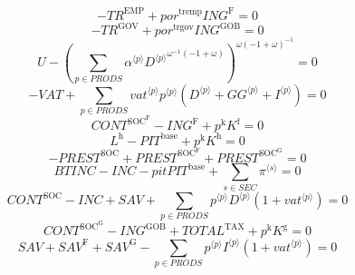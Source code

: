 \begin{equation}
-{T\!R}^{\mathrm{EMP}} + {{p\!o\!r}^{\mathrm{tremp}}} {{I\!N\!G}^{\mathrm{F}}} = 0
\end{equation}
\begin{equation}
-{T\!R}^{\mathrm{GOV}} + {{p\!o\!r}^{\mathrm{trgov}}} {{I\!N\!G}^{\mathrm{GOB}}} = 0
\end{equation}
\begin{equation}
U - \left(\sum_{p\in {P\!R\!O\!D\!S}} {{\alpha}^{\langle p\rangle}} {{{D}^{\langle p\rangle}}^{{\omega}^{-1} \left(-1 + \omega\right)}}\right)^{{\omega} \left(-1 + \omega\right)^{-1}} = 0
\end{equation}
\begin{equation}
-{V\!A\!T} + \sum_{p\in {P\!R\!O\!D\!S}} {{{v\!a\!t}}^{\langle p\rangle}} {{p}^{\langle p\rangle}} \left({D}^{\langle p\rangle} + {{G\!G}}^{\langle p\rangle} + {I}^{\langle p\rangle}\right) = 0
\end{equation}
\begin{equation}
{C\!O\!N\!T}^{\mathrm{SOC}^{\mathrm{F}}} - {I\!N\!G}^{\mathrm{F}} + {p^{\mathrm{k}}} {K^{\mathrm{f}}} = 0
\end{equation}
\begin{equation}
L^{\mathrm{h}} - {P\!I\!T}^{\mathrm{base}} + {p^{\mathrm{k}}} {K^{\mathrm{h}}} = 0
\end{equation}
\begin{equation}
-{P\!R\!E\!S\!T}^{\mathrm{SOC}} + {P\!R\!E\!S\!T}^{\mathrm{SOC}^{\mathrm{F}}} + {P\!R\!E\!S\!T}^{\mathrm{SOC}^{\mathrm{G}}} = 0
\end{equation}
\begin{equation}
{B\!T\!I\!N\!C} - {I\!N\!C} - {{p\!i\!t}} {{P\!I\!T}^{\mathrm{base}}} + \sum_{s\in {S\!E\!C}} {\pi}^{\langle s\rangle} = 0
\end{equation}
\begin{equation}
{C\!O\!N\!T}^{\mathrm{SOC}} - {I\!N\!C} + {S\!A\!V} + \sum_{p\in {P\!R\!O\!D\!S}} {{p}^{\langle p\rangle}} {{D}^{\langle p\rangle}} \left(1 + {{v\!a\!t}}^{\langle p\rangle}\right) = 0
\end{equation}
\begin{equation}
{C\!O\!N\!T}^{\mathrm{SOC}^{\mathrm{G}}} - {I\!N\!G}^{\mathrm{GOB}} + {T\!O\!T\!A\!L}^{\mathrm{TAX}} + {p^{\mathrm{k}}} {K^{\mathrm{g}}} = 0
\end{equation}
\begin{equation}
{S\!A\!V} + {S\!A\!V}^{\mathrm{F}} + {S\!A\!V}^{\mathrm{G}} - \sum_{p\in {P\!R\!O\!D\!S}} {{p}^{\langle p\rangle}} {{I}^{\langle p\rangle}} \left(1 + {{v\!a\!t}}^{\langle p\rangle}\right) = 0
\end{equation}
